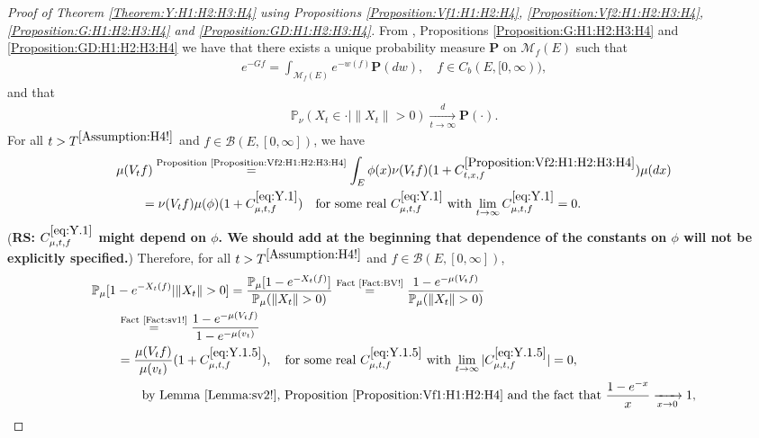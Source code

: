 \documentclass[12pt,a4paper]{amsart}
\numberwithin{equation}{section}
\theoremstyle{plain}
\theoremstyle{definition}
\theoremstyle{remark}
\newcounter{N}
\newcounter{n}[N]
\begin{document}
\begin{proof}[ Proof of Theorem \ref{Theorem:Y:H1:H2:H3:H4} using Propositions \ref{Proposition:Vf1:H1:H2:H4}, \ref{Proposition:Vf2:H1:H2:H3:H4}, \ref{Proposition:G:H1:H2:H3:H4} and \ref{Proposition:GD:H1:H2:H3:H4}]
From \cite[Proposition 1.19]{Li2011MeasureValued}, Propositions \ref{Proposition:G:H1:H2:H3:H4} and \ref{Proposition:GD:H1:H2:H3:H4}  we have that there exists a unique probability measure $\mathbf P$ on $\mathcal M_f(E)$ such that
\begin{align}
 e^{-Gf}
 = \int_{\mathcal M_f(E)} e^{- w(f)} \mathbf P(dw),
 \quad f\in C_b (E, [0,\infty)),
\end{align}
and that
\begin{align}\label{eq:Y.0}
 \mathbb P_{\nu}(X_t \in \cdot | \|X_t\|>0 )
 \xrightarrow[t\to \infty]{d} \mathbf P(\cdot).
 \end{align}
For all $t>T^{\ref{Assumption:H4!}}$ and $f \in \mathcal B(E,[0,\infty])$, we have
\begin{align}
\MoveEqLeft \mu(V_tf) \overset{\text{Proposition \ref{Proposition:Vf2:H1:H2:H3:H4}}}= \int_E  \phi(x) \nu (V_tf) (1+C^{\ref{Proposition:Vf2:H1:H2:H3:H4}}_{t,x,f})\mu(dx)
\\ \label{eq:Y.1} & = \nu(V_tf) \mu(\phi)(1+ C^{\eqref{eq:Y.1}}_{\mu,t,f})\quad \text{for some real $C^{\eqref{eq:Y.1}}_{\mu,t,f}$ with $\lim_{t\to \infty} C^{\eqref{eq:Y.1}}_{\mu,t,f} = 0$}.
\end{align}
({\bf RS: $C^{\eqref{eq:Y.1}}_{\mu,t,f}$ might depend on $\phi$. We should add at the beginning that dependence of the constants on $\phi$ will not be explicitly specified.})
Therefore, for all $t > T^{\ref{Assumption:H4!}}$ and $f\in \mathcal B(E,[0,\infty])$,
\begin{align}
 \MoveEqLeft \mathbb P_\mu [1 - e^{-X_t(f)}|\|X_t\|>0] = \frac{\mathbb P_\mu [ 1 - e^{- X_t(f)}]} {\mathbb P_\mu (\|X_t\| > 0) } \overset{\text{Fact \ref{Fact:BV!}}}= \frac{1 - e^{- \mu(V_tf)}} { \mathbb P_\mu(\|X_t\| > 0)}
 \\&\overset{\text{Fact \ref{Fact:sv1!}}}= \frac{1 - e^{- \mu(V_tf)}} {1 - e^{-\mu(v_t)}}
 \\\label{eq:Y.1.5}& = \frac{ \mu(V_t f) }{ \mu(v_t) } (1+C^{\eqref{eq:Y.1.5}}_{\mu,t,f}), \quad \text{for some real $C^{\eqref{eq:Y.1.5}}_{\mu,t,f}$ with $\lim_{t\to \infty} |C^{\eqref{eq:Y.1.5}}_{\mu,t,f}| = 0$},
 \\&\qquad\text{by Lemma \ref{Lemma:sv2!}, Proposition \ref{Proposition:Vf1:H1:H2:H4} and the fact that $\frac{1-e^{-x}}{x} \xrightarrow[x\to 0]{}1$},

\end{align}
\end{proof}
\end{document}
